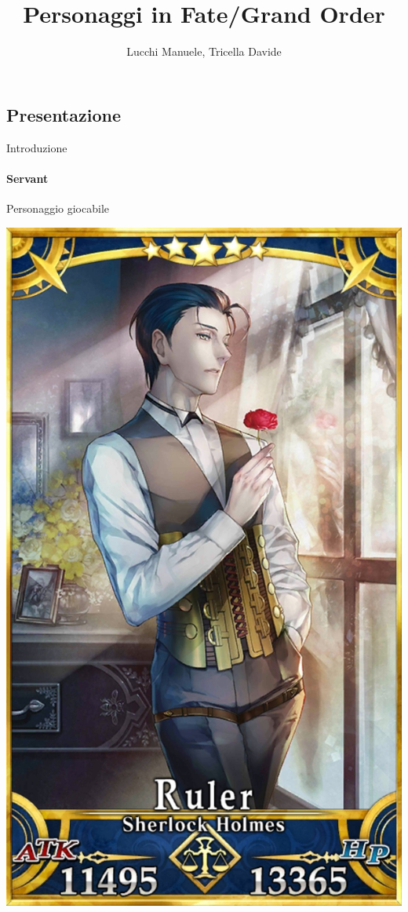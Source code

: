 \documentclass{beamer}
\title{Personaggi in Fate/Grand Order} %
\author{Lucchi Manuele, Tricella Davide}
\begin{document}
\frame[c]{\maketitle}

\begin{darkframes}

  \section{Presentazione}

  \begin{frame}{Introduzione}
    \framesubtitle{Servant}
    \begin{varwidth}{\textwidth}
      Personaggio giocabile\\

    \end{varwidth}
    \hfil
    \begin{varwidth}{\textwidth}
      \hspace{2.5cm}
      \includegraphics[height=0.75\textheight]{./images/servant.png}
    \end{varwidth}
  \end{frame}


\end{darkframes}
\end{document}
